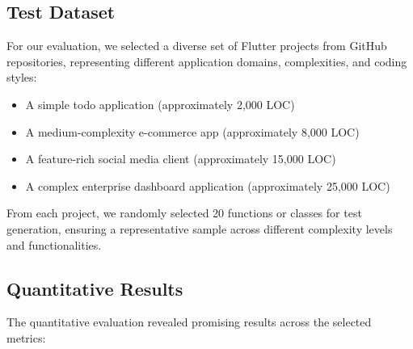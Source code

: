 \subsection{Test Dataset}

For our evaluation, we selected a diverse set of Flutter projects from GitHub repositories, representing different application domains, complexities, and coding styles:

\begin{itemize}
    \item A simple todo application (approximately 2,000 LOC)
    \item A medium-complexity e-commerce app (approximately 8,000 LOC)
    \item A feature-rich social media client (approximately 15,000 LOC)
    \item A complex enterprise dashboard application (approximately 25,000 LOC)
\end{itemize}

From each project, we randomly selected 20 functions or classes for test generation, ensuring a representative sample across different complexity levels and functionalities.

\subsection{Quantitative Results}

The quantitative evaluation revealed promising results across the selected metrics:

\begin{table}[ht]
    \centering
    \caption{Test Generation Accuracy Metrics}
    \label{tab:accuracy-metrics}
\end{table}

